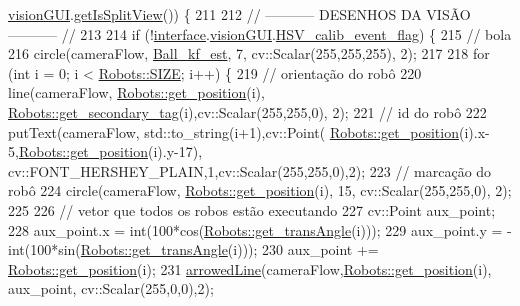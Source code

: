 \begin{DoxyCode}
      \hyperlink{class_v_s_s_s___g_u_i_1_1_v4_l_interface_a7a2432ad62a960423bc3370abe5c8930}{visionGUI}.\hyperlink{class_vision_g_u_i_a2d3a0e0b04ac1b80070e9123ec354d83}{getIsSplitView}()) \{
211 
212         \textcolor{comment}{// ----------- DESENHOS DA VISÃO ----------- //}
213 
214         \textcolor{keywordflow}{if} (!\hyperlink{class_cam_cap_a58002893dfb61307042ddbba0c362dcd}{interface}.\hyperlink{class_v_s_s_s___g_u_i_1_1_v4_l_interface_a7a2432ad62a960423bc3370abe5c8930}{visionGUI}.\hyperlink{class_vision_g_u_i_ac732afeda7552e0c1dc4db8d63633be2}{HSV\_calib\_event\_flag}) \{
215             \textcolor{comment}{// bola}
216             circle(cameraFlow, \hyperlink{class_cam_cap_a8e27afe151d46cfbf000fe900ce013b8}{Ball\_kf\_est}, 7, cv::Scalar(255,255,255), 2);
217 
218             \textcolor{keywordflow}{for} (\textcolor{keywordtype}{int} i = 0; i < \hyperlink{class_robots_ae9df2f1d345ad6740f0459956cdd4712}{Robots::SIZE}; i++) \{
219                 \textcolor{comment}{// orientação do robô}
220                 line(cameraFlow, \hyperlink{class_robots_a1fca8f2f5070176faa6ba1efa2f1ff14}{Robots::get\_position}(i), 
      \hyperlink{class_robots_a2ebc2bd5efa2313e9f39d676fa70f86a}{Robots::get\_secondary\_tag}(i),cv::Scalar(255,255,0), 2);
221                 \textcolor{comment}{// id do robô}
222                 putText(cameraFlow, std::to\_string(i+1),cv::Point(
      \hyperlink{class_robots_a1fca8f2f5070176faa6ba1efa2f1ff14}{Robots::get\_position}(i).x-5,\hyperlink{class_robots_a1fca8f2f5070176faa6ba1efa2f1ff14}{Robots::get\_position}(i).y-17),
      cv::FONT\_HERSHEY\_PLAIN,1,cv::Scalar(255,255,0),2);
223                 \textcolor{comment}{// marcação do robô}
224                 circle(cameraFlow, \hyperlink{class_robots_a1fca8f2f5070176faa6ba1efa2f1ff14}{Robots::get\_position}(i), 15, cv::Scalar(255,255,0), 
      2);
225 
226                 \textcolor{comment}{// vetor que todos os robos estão executando}
227                 cv::Point aux\_point;
228                 aux\_point.x = int(100*cos(\hyperlink{class_robots_af3cabeacfb88dd920f581939935e76ca}{Robots::get\_transAngle}(i)));
229                 aux\_point.y = - int(100*sin(\hyperlink{class_robots_af3cabeacfb88dd920f581939935e76ca}{Robots::get\_transAngle}(i)));
230                 aux\_point += \hyperlink{class_robots_a1fca8f2f5070176faa6ba1efa2f1ff14}{Robots::get\_position}(i);
231                 \hyperlink{class_cam_cap_afb044a7b5b3b2f17af62e3115e84993e}{arrowedLine}(cameraFlow,\hyperlink{class_robots_a1fca8f2f5070176faa6ba1efa2f1ff14}{Robots::get\_position}(i), aux\_point,
      cv::Scalar(255,0,0),2);

\end{DoxyCode}
